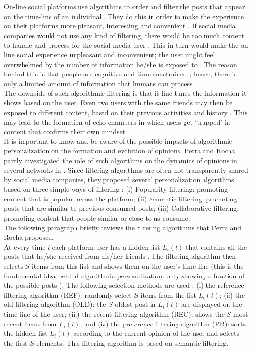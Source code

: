 \documentclass[11 pt , letterpaper , twoside , openright]{book}
\begin{document}
On-line social platforms use algorithms to order and filter the posts that appear on the time-line of an individual \cite{Perra2019}. They do this in order to make the experience on their platforms more pleasant, interesting and convenient \cite{Perra2019}. If social media companies would not use any kind of filtering, there would be too much content to handle and process for the social media user \cite{Bozdag2013}. This in turn would make the on-line social experience unpleasant and inconvenient; the user might feel overwhelmed by the number of information he/she is exposed to \cite{Bozdag2013}. The reason behind this is that people are cognitive and time constrained \cite{Perra2019}; hence, there is only a limited amount of information that humans can process \cite{Bozdag2013}.\\
\newline
The downside of such algorithmic filtering is that it fine-tunes the information it shows based on the user. Even two users with the same friends may then be exposed to different content, based on their previous activities and history \cite{Bozdag2013}. This may lead to the formation of echo chambers in which users get `trapped' in content that confirms their own mindset \cite{Bozdag2013}. \\
\newline
It is important to know and be aware of the possible impacts of algorithmic personalization on the formation and evolution of opinions. Perra and Rocha partly investigated the role of such algorithms on the dynamics of opinions in several networks in \cite{Perra2019}. Since filtering algorithms are often not transparently shared by social media companies, they proposed several personalization algorithms based on three simple ways of filtering \cite{Perra2019}: (i) Popularity filtering: promoting content that is popular across the platform; (ii) Semantic filtering: promoting posts that are similar to previous consumed posts; (iii) Collaborative filtering: promoting content that people similar or close to us consume.\\ 
\newline
The following paragraph briefly reviews the filtering algorithms that Perra and Rocha proposed. \\
\newline
At every time $t$ each platform user has a hidden list $L_i(t)$ that contains all the posts that he/she received from his/her friends \cite{Perra2019}. The filtering algorithm then selects $S$ items from this list and shows them on the user's time-line (this is the fundamental idea behind algorithmic personalization: only showing a fraction of the possible posts \cite{Perra2019}). The following selection methods are used \cite{Perra2019}: (i) the reference filtering algorithm (REF): randomly select $S$ items from the list $L_i(t)$; (ii) the old filtering algorithm (OLD): the $S$ oldest post in $L_i(t)$ are displayed on the time-line of the user; (iii) the recent filtering algorithm (REC): shows the $S$ most recent items from $L_i(t)$; and (iv) the preference filtering algorithm (PR): sorts the hidden list $L_i(t)$ according to the current opinion of the user and selects the first $S$ elements. This filtering algorithm is based on semantic filtering.\\
\end{document}
